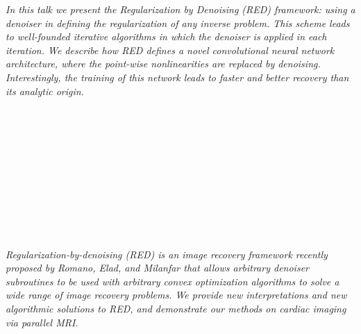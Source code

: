   \begin{multicols}{2}
      \textit{In this talk we present the Regularization by Denoising (RED) framework: using a denoiser in defining the regularization of any inverse problem. This scheme leads to well-founded iterative algorithms in which the denoiser is applied in each iteration. We describe how RED defines a novel convolutional neural network architecture, where the point-wise nonlinearities are replaced by denoising. Interestingly, the training of this network leads to faster and better recovery than its analytic origin.}\\
\\ 
        \\
        \\\\
        \\
        \\\\
        \\
        \\\\
\\
      \textit{Regularization-by-denoising (RED) is an image recovery framework recently proposed by Romano, Elad, and Milanfar that allows arbitrary denoiser subroutines to be used with arbitrary convex optimization algorithms to solve a wide range of image recovery problems. We provide new interpretations and new algorithmic solutions to RED, and demonstrate our methods on cardiac imaging via parallel MRI.}\\
\\ 
        \\
        \\\\
        \\
        \\\\
        \\
        \\\\
        \\
        \\\\
\\

\end{multicols}
